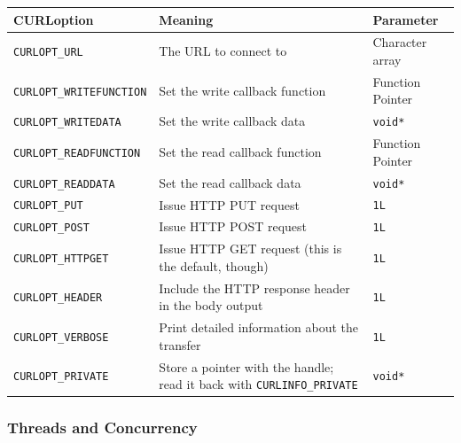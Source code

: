 \documentclass[legalpaper,10pt]{article}
\begin{document}
\begin{tabular}{l|l|l}
	\textbf{CURLoption} & \textbf{Meaning} & \textbf{Parameter} \\ \hline
	\texttt{CURLOPT\_URL} & The URL to connect to & Character array \\ \hline
	\texttt{CURLOPT\_WRITEFUNCTION} & Set the write callback function & Function Pointer \\ \hline
	\texttt{CURLOPT\_WRITEDATA} & Set the write callback data & \texttt{void*} \\ \hline
	\texttt{CURLOPT\_READFUNCTION} & Set the read callback function & Function Pointer \\ \hline
	\texttt{CURLOPT\_READDATA} & Set the read callback data & \texttt{void*} \\ \hline
	\texttt{CURLOPT\_PUT} & Issue HTTP PUT request & \texttt{1L}\\ \hline
	\texttt{CURLOPT\_POST} & Issue HTTP POST request & \texttt{1L}\\ \hline
	\texttt{CURLOPT\_HTTPGET} & Issue HTTP GET request (this is the default, though) & \texttt{1L}\\ \hline
	\texttt{CURLOPT\_HEADER} & Include the HTTP response header in the body output & \texttt{1L}\\ \hline
	\texttt{CURLOPT\_VERBOSE} & Print detailed information about the transfer & \texttt{1L}\\ \hline
	\texttt{CURLOPT\_PRIVATE} & Store a pointer with the handle; read it back with \texttt{CURLINFO\_PRIVATE} & \texttt{void*}\\
\end{tabular}


\subsubsection*{Threads and Concurrency}
\end{document}

